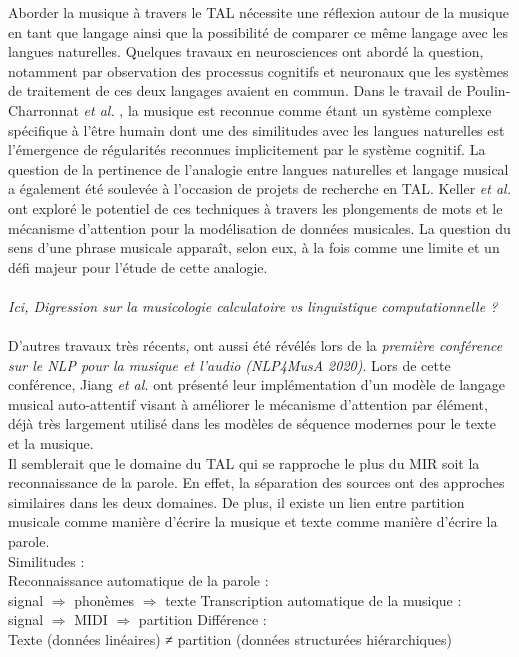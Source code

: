 Aborder la musique à travers le TAL nécessite une réflexion autour de la musique en tant que langage ainsi que la possibilité de comparer ce même langage avec les langues naturelles. Quelques travaux en neurosciences ont abordé la question, notamment par observation des processus cognitifs et neuronaux que les systèmes de traitement de ces deux langages avaient en commun. Dans le travail de Poulin-Charronnat \textit{et al.} \cite{poulincharronnat:hal-01985213}, la musique est reconnue comme étant un système complexe spécifique à l’être humain dont une des similitudes avec les langues naturelles est l’émergence de régularités reconnues implicitement par le système cognitif. La question de la pertinence de l’analogie entre langues naturelles et langage musical a également été soulevée à l’occasion de projets de recherche en TAL. Keller \textit{et al.} \cite{keller:hal-03279850} ont exploré le potentiel de ces techniques à travers les plongements de mots et le mécanisme d’attention pour la modélisation de données musicales. La question du sens d’une phrase musicale apparaît, selon eux, à la fois comme une limite et un défi majeur pour l’étude de cette analogie.\\\\
\textit{Ici, Digression sur la musicologie calculatoire vs linguistique computationnelle ?}\\\\
D’autres travaux très récents, ont aussi été révélés lors de la \textit{première conférence sur le NLP pour la musique et l'audio (NLP4MusA 2020)}. Lors de cette conférence, Jiang \textit{et al.} \cite{Jiang2020DiscoveringMR} ont présenté leur implémentation d’un modèle de langage musical auto-attentif visant à améliorer le mécanisme d'attention par élément, déjà très largement utilisé dans les modèles de séquence modernes pour le texte et la musique.\\
Il semblerait que le domaine du TAL qui se rapproche le plus du MIR soit la reconnaissance de la parole. En effet, la séparation des sources ont des approches similaires dans les deux domaines. De plus, il existe un lien entre partition musicale comme manière d’écrire la musique et texte comme manière d’écrire la parole.\\
Similitudes :\\
Reconnaissance automatique de la parole :\\
signal $\Rightarrow$ phonèmes $\Rightarrow$ texte
Transcription automatique de la musique :\\
signal $\Rightarrow$ MIDI $\Rightarrow$ partition
Différence :\\
Texte (données linéaires) ≠ partition (données structurées hiérarchiques)
